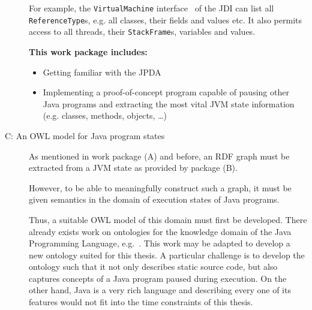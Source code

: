 \documentclass[
	english,
	accentcolor=9c,%
  marginpar=0cm %
	]{tudapub}
\begin{document}
\begin{description}
    For example, the \lstinline|VirtualMachine| interface~\cite{VirtualMachine}
    of the JDI can list all \lstinline|ReferenceType|s, e.g. all classes, their
    fields and values etc.
    It also permits access to all threads, their \lstinline|StackFrame|s,
    variables and values.

    \textbf{This work package includes:}
    \begin{itemize}
      \item Getting familiar with the JPDA
      \item Implementing a proof-of-concept program capable of pausing other
        Java programs and extracting the most vital JVM state information
        (e.g. classes, methods, objects, \ldots)
    \end{itemize}
  \item[C: An OWL model for Java program states]
    As mentioned in work package (A) and before, an RDF graph must be
    extracted from a JVM state as provided by package (B).
    
    However, to be able to meaningfully construct such a graph, it must be
    given semantics in the domain of execution states of Java programs.

    Thus, a suitable OWL model of this domain must first be developed.
    There already exists work on ontologies for the knowledge domain of the Java
    Programming Language, e.g.~\cite{kouneli2012modeling,atzeni2017codeontology}.
    This work may be adapted to develop a new ontology suited for this thesis.
    A particular challenge is to develop the ontology such that it
    not only describes static source code, but also captures concepts of a Java
    program paused during execution.
    On the other hand, Java is a very rich language and describing every one of
    its features would not fit into the time constraints of this thesis.


\end{description}
\end{document}
